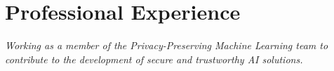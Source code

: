 \documentclass[11pt]{article}
\begin{document}
\section{Professional Experience}

\textit{Working as a member of the Privacy-Preserving Machine Learning team to contribute to the development of secure and trustworthy AI solutions.}
\end{document}
